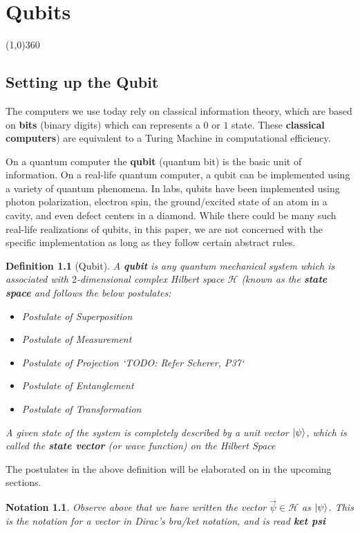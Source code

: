 \documentclass[12pt,twoside]{report}
\newtheorem{defn}[subsection]{Definition}
\newtheorem{notation}[subsection]{Notation}
\begin{document}
\chapter{Qubits}
\line(1,0){360} \\
\section{Setting up the Qubit}

The computers we use today rely on classical information theory, which are based on \textbf{bits} (binary digits) which can represents a $0$ or $1$ state. These \textbf{classical computers}) are equivalent to a Turing Machine in computational efficiency. 

On a quantum computer the \textbf{qubit} (quantum bit) is the basic unit of information. On a real-life quantum computer, a qubit can be implemented using a variety of quantum phenomena. In labs, qubits have been implemented using photon polarization, electron spin, the ground/excited state of an atom in a cavity, and even defect centers in a diamond. While there could be many such real-life realizations of qubits, in this paper, we are not concerned with the specific implementation as long as they follow certain abstract rules.

\begin{samepage}
\begin{defn}[Qubit]
A \textbf{qubit} is any quantum mechanical system which is associated with $2$-dimensional complex Hilbert space $\mathcal{H}$ (known as the \textbf{state space} and follows the below postulates:
\begin{itemize}
    \item Postulate of Superposition
    \item Postulate of Measurement
    \item Postulate of Projection `TODO: Refer Scherer, P37`
    \item Postulate of Entanglement
    \item Postulate of Transformation
\end{itemize}
 A given state of the system is completely described by a
 \textit{unit vector} $\ket{\psi}$, which is called the \textbf{state vector} (or wave function) on the Hilbert Space
\end{defn}
The postulates in the above definition will be elaborated on in the upcoming sections.
\end{samepage}

\begin{notation}
    Observe above that we have written the vector $\vec{\psi} \in \mathcal{H}$ as $\ket{\psi}$. This is the notation for a vector in \textnormal{Dirac's bra/ket notation}, and is read \textbf{ket psi}
\end{notation}
\end{document}
